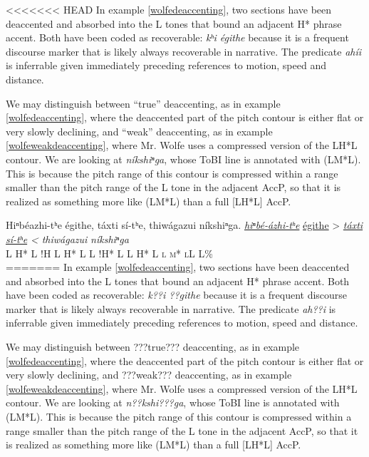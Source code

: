 \documentclass[output=paper]{LSP/langsci}
\begin{document}
<<<<<<< HEAD
In example \ref{wolfedeaccenting}, two sections have been deaccented and absorbed into the L tones that bound an adjacent H* phrase accent. Both have been coded as recoverable: \textit{kʰi égithe} because it is a frequent discourse marker that is likely always recoverable in narrative. The predicate \textit{ahíi} is inferrable given immediately preceding references to motion, speed and distance.

We may distinguish between “true” deaccenting, as in example \ref{wolfedeaccenting}, where the deaccented part of the pitch contour is either flat or very slowly declining, and “weak” deaccenting, as in example \ref{wolfeweakdeaccenting}, where Mr. Wolfe uses a compressed version of the LH*L contour. We are looking at \textit{níkshiⁿga}, whose ToBI line is annotated with (LM*L). This is because the pitch range of this contour is compressed within a range smaller than the pitch range of the L tone in the adjacent AccP, so that it is realized as something more like (LM*L) than a full [LH*L] AccP.

\ea\label{wolfeweakdeaccenting}
Hiⁿbéazhi-tʰe égithe, táxti sí-tʰe, thiwágazui níkshiⁿga.\footnotemark
\glll	\emph{\underline{hiⁿbé-ázhi-tʰe}}	{\underline{égithe} >}				\emph{\underline{táxti}}		\emph{\underline{sí-tʰe} <}		\emph{thiwágazui}	\emph{níkshiⁿga}\\
	{\ob L H* L}					{\cb{}!H}	{\ob L H* L\cb}			{\ob L !H* L\cb}				{\ob L H* L}			{\op \textsc{l m* l}\cp\cb{}L L\%}\\
=======
In example \ref{wolfedeaccenting}, two sections have been deaccented and absorbed into the L tones that bound an adjacent H* phrase accent. Both have been coded as recoverable: \textit{k??i ??githe} because it is a frequent discourse marker that is likely always recoverable in narrative. The predicate \textit{ah??i} is inferrable given immediately preceding references to motion, speed and distance.

We may distinguish between ???true??? deaccenting, as in example \ref{wolfedeaccenting}, where the deaccented part of the pitch contour is either flat or very slowly declining, and ???weak??? deaccenting, as in example \ref{wolfeweakdeaccenting}, where Mr. Wolfe uses a compressed version of the LH*L contour. We are looking at \textit{n??kshi???ga}, whose ToBI line is annotated with (LM*L). This is because the pitch range of this contour is compressed within a range smaller than the pitch range of the L tone in the adjacent AccP, so that it is realized as something more like (LM*L) than a full [LH*L] AccP.
\end{document}
